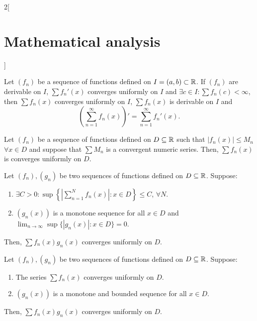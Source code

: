 \documentclass[../../../main.tex]{subfiles}
\begin{document}
\begin{multicols}{2}[\section{Mathematical analysis}]
  \begin{theorem}
    Let $(f_n)$ be a sequence of functions defined on $I=(a,b)\subset\mathbb{R} $. If $(f_n)$ are derivable on $I$, $\sum f_n'(x)$ converges uniformly on $I$ and $\exists c\in I:\sum f_n(c)<\infty$, then $\sum f_n(x)$ converges uniformly on $I$, $\sum f_n(x)$ is derivable on $I$ and $$\left(\sum_{n=1}^\infty f_n(x)\right)'=\sum_{n=1}^\infty f_n'(x).$$
  \end{theorem}
  \begin{theorem}
    Let $(f_n)$ be a sequence of functions defined on $D\subseteq\mathbb{R} $ such that $|f_n(x)|\leq M_n$ $\forall x\in D$ and suppose that $\sum M_n$ is a convergent numeric series. Then, $\sum f_n(x)$ is converges uniformly on $D$.
  \end{theorem}
  \begin{theorem}
    Let $(f_n),(g_n)$ be two sequences of functions defined on $D\subseteq\mathbb{R} $. Suppose:
    \begin{enumerate}
      \item $\displaystyle\exists C>0: \sup\left\{\left|\sum_{n=1}^Nf_n(x)\right|:x\in D\right\}\leq C$, $\forall N$.
      \item $(g_n(x))$ is a monotone sequence for all $x\in D$ and $\displaystyle\lim_{n\to\infty}\sup\{|g_n(x)|:x\in D\}=0$.
    \end{enumerate}
    Then, $\sum f_n(x)g_n(x)$ converges uniformly on $D$.
  \end{theorem}
  \begin{theorem}
    Let $(f_n),(g_n)$ be two sequences of functions defined on $D\subseteq\mathbb{R} $. Suppose:
    \begin{enumerate}
      \item The series $\sum f_n(x)$ converges uniformly on $D$.
      \item $(g_n(x))$ is a monotone and bounded sequence for all $x\in D$.
    \end{enumerate}
    Then, $\sum f_n(x)g_n(x)$ converges uniformly on $D$.
  \end{theorem}

\end{multicols}
\end{document}
